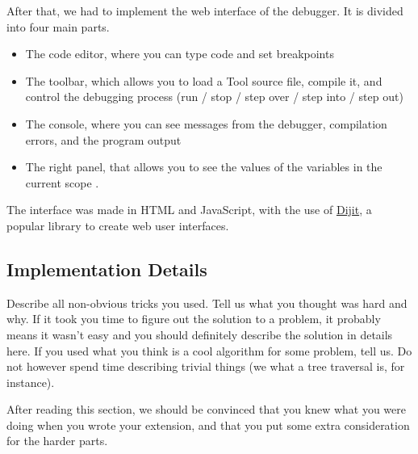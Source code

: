After that, we had to implement the web interface of the debugger. It is divided into four main parts.

\begin{itemize}
\item The code editor, where you can type code and set breakpoints
\item The toolbar, which allows you to load a Tool source file, compile it, and control the debugging process (run / stop / step over / step into / step out)
\item The console, where you can see messages from the debugger, compilation errors, and the program output
\item The right panel, that allows you to see the values of the variables in the current scope
\iftoggle{callstackdone}{%
	and the callstack
}{%
}.
\end{itemize}

The interface was made in HTML and JavaScript, with the use of \href{http://dojotoolkit.org/reference-guide/1.10/dijit/}{Dijit}, a popular library to create web user interfaces.

\subsection{Implementation Details}
Describe all non-obvious tricks you used. Tell us what you thought was hard and
why. If it took you time to figure out the solution to a problem, it probably
means it wasn't easy and you should definitely describe the solution in details
here. If you used what you think is a cool algorithm for some problem, tell us.
Do not however spend time describing trivial things (we what a tree traversal
is, for instance). 

After reading this section, we should be convinced that you knew what you were
doing when you wrote your extension, and that you put some extra consideration
for the harder parts.

